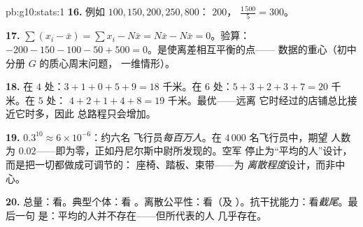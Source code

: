 \begin{solution}{pb:g10:stats:1}
\textbf{16.} 例如 $100, 150, 200, 250, 800$：
$200$， $\frac{1\,500}{5} = 300$。

\textbf{17.} $\sum (x_i - \bar x) = \sum x_i - N \bar x =
N\bar x - N\bar x = 0$。验算：$-200 - 150 - 100 - 50 + 500 =
0$。是使离差相互平衡的点——
数据的重心（初中分册 $G$ 的质心周末问题，
一维情形）。

\textbf{18.} 在 $4$ 处：$3 + 1 + 0 + 5 + 9 = 18$ 千米。在
 $6$ 处：$5 + 3 + 2 + 3 + 7 = 20$ 千米。在 $5$ 处：
$4 + 2 + 1 + 4 + 8 = 19$ 千米。最优——远离
它时经过的店铺总比接近它时多，因此
总路程只会增加。

\textbf{19.} $0.3^{10} \approx 6 \times 10^{-6}$：约六名
飞行员\emph{每百万人}。在 $4\,000$ 名飞行员中，期望
人数为 $0.02$——即为零，正如丹尼尔斯中尉所发现的。空军
停止为“平均的人”设计，而是把一切都做成可调节的：
座椅、踏板、束带——为
\emph{离散程度}设计，而非中心。

\textbf{20.} 总量：看\emph{}。典型个体：看
\emph{}。离散公平性：看\emph{}（及
）。抗干扰能力：看\emph{截尾}。最后一句
是：平均的人并不存在——但所代表的人
几乎存在。
\end{solution}
